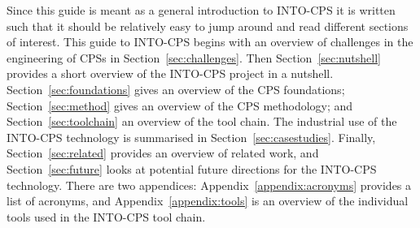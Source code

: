 Since this guide is meant as a general introduction to INTO-CPS it is written such that it should be relatively easy to jump around and read different sections of interest. This guide to INTO-CPS begins with an overview of challenges in the engineering of CPSs in Section~\ref{sec:challenges}. Then Section~\ref{sec:nutshell} provides a short overview of the INTO-CPS project in a nutshell. Section~\ref{sec:foundations} gives an overview of the CPS foundations; Section~\ref{sec:method} gives an overview of the CPS methodology; and Section~\ref{sec:toolchain} an overview of the tool chain. The industrial use of the INTO-CPS technology is summarised in Section~\ref{sec:casestudies}. Finally, Section~\ref{sec:related} provides an overview of related work, and Section~\ref{sec:future} looks at potential future directions for the INTO-CPS technology. 
There are two appendices: Appendix~\ref{appendix:acronyms} provides a list of acronyms,  
and Appendix~\ref{appendix:tools} is an overview of the individual tools used in the INTO-CPS tool chain.

